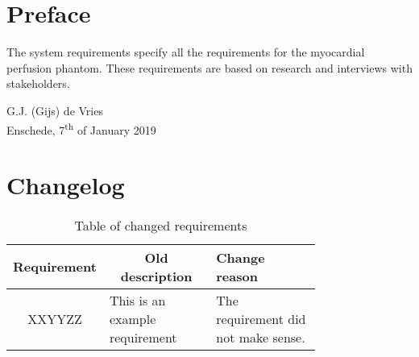 \chapter*{Preface}

\vskip-10pt
The system requirements specify all the requirements for the myocardial perfusion phantom. These requirements are based on research and interviews with stakeholders.

\vskip50pt
G.J. (Gijs) de Vries\\
Enschede, 7\textsuperscript{th} of January 2019

\chapter*{Changelog}

\begin{table} [h]
\caption{ Table of changed requirements }
	\begin{tabular}{|c|p{0.38\linewidth}|p{0.38\linewidth}|}
		\multicolumn{1}{l}{\textbf{Requirement}} & \multicolumn{1}{c}{\textbf{Old description}} & \multicolumn{1}{l}{\textbf{Change reason}} \\
		\hline
		XXYYZZ & This is an example requirement & The requirement did not make sense. \\
		\hline
	\end{tabular}
\end{table}